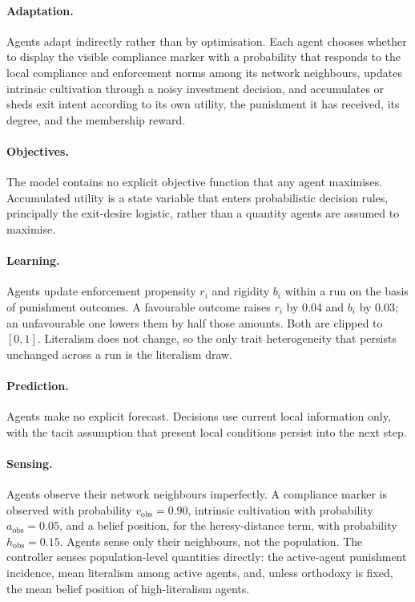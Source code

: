 \documentclass[12pt]{article}
\begin{document}
\paragraph{Adaptation.} Agents adapt indirectly rather than by optimisation.
Each agent chooses whether to display the visible compliance marker with a
probability that responds to the local compliance and enforcement norms among
its network neighbours, updates intrinsic cultivation through a noisy investment
decision, and accumulates or sheds exit intent according to its own utility,
the punishment it has received, its degree, and the membership reward.

\paragraph{Objectives.} The model contains no explicit objective function that
any agent maximises. Accumulated utility is a state variable that enters
probabilistic decision rules, principally the exit-desire logistic, rather than
a quantity agents are assumed to maximise.

\paragraph{Learning.} Agents update enforcement propensity \(r_i\) and rigidity
\(b_i\) within a run on the basis of punishment outcomes. A favourable outcome
raises \(r_i\) by 0.04 and \(b_i\) by 0.03; an unfavourable one lowers them by
half those amounts. Both are clipped to \([0,1]\). Literalism does not change,
so the only trait heterogeneity that persists unchanged across a run is the
literalism draw.

\paragraph{Prediction.} Agents make no explicit forecast. Decisions use current
local information only, with the tacit assumption that present local conditions
persist into the next step.

\paragraph{Sensing.} Agents observe their network neighbours imperfectly. A
compliance marker is observed with probability \(v_{\mathrm{obs}}=0.90\),
intrinsic cultivation with probability \(a_{\mathrm{obs}}=0.05\), and a belief
position, for the heresy-distance term, with probability
\(h_{\mathrm{obs}}=0.15\). Agents sense only their neighbours, not the
population. The controller senses population-level quantities directly: the
active-agent punishment incidence, mean literalism among active agents, and,
unless orthodoxy is fixed, the mean belief position of high-literalism agents.
\end{document}
